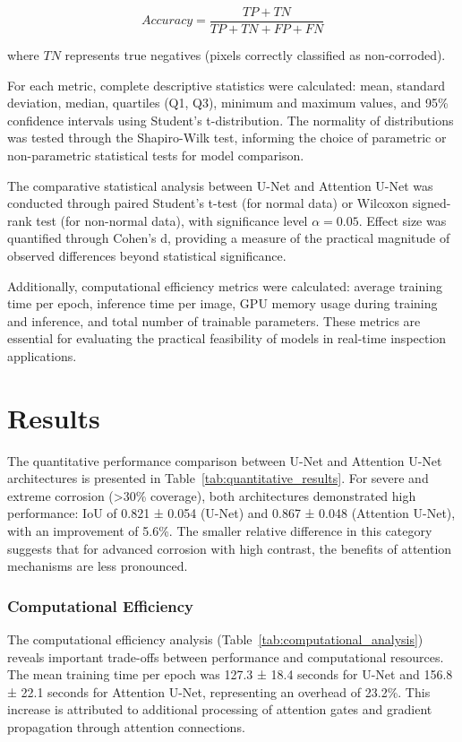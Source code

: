 \documentclass[Journal,letterpaper]{ascelike-new}
\begin{document}
\begin{equation}
Accuracy = \frac{TP + TN}{TP + TN + FP + FN}
\label{eq:accuracy}
\end{equation}

where $TN$ represents true negatives (pixels correctly classified as non-corroded).

For each metric, complete descriptive statistics were calculated: mean, standard deviation, median, quartiles (Q1, Q3), minimum and maximum values, and 95\% confidence intervals using Student's t-distribution. The normality of distributions was tested through the Shapiro-Wilk test, informing the choice of parametric or non-parametric statistical tests for model comparison.

The comparative statistical analysis between U-Net and Attention U-Net was conducted through paired Student's t-test (for normal data) or Wilcoxon signed-rank test (for non-normal data), with significance level $\alpha=0.05$. Effect size was quantified through Cohen's d, providing a measure of the practical magnitude of observed differences beyond statistical significance.

Additionally, computational efficiency metrics were calculated: average training time per epoch, inference time per image, GPU memory usage during training and inference, and total number of trainable parameters. These metrics are essential for evaluating the practical feasibility of models in real-time inspection applications.

\section{Results}
\label{sec:results}

The quantitative performance comparison between U-Net and Attention U-Net architectures is presented in Table~\ref{tab:quantitative_results}. For severe and extreme corrosion (>30\% coverage), both architectures demonstrated high performance: IoU of 0.821 ± 0.054 (U-Net) and 0.867 ± 0.048 (Attention U-Net), with an improvement of 5.6\%. The smaller relative difference in this category suggests that for advanced corrosion with high contrast, the benefits of attention mechanisms are less pronounced.

\subsubsection{Computational Efficiency}

The computational efficiency analysis (Table~\ref{tab:computational_analysis}) reveals important trade-offs between performance and computational resources. The mean training time per epoch was 127.3 ± 18.4 seconds for U-Net and 156.8 ± 22.1 seconds for Attention U-Net, representing an overhead of 23.2\%. This increase is attributed to additional processing of attention gates and gradient propagation through attention connections.
\end{document}
